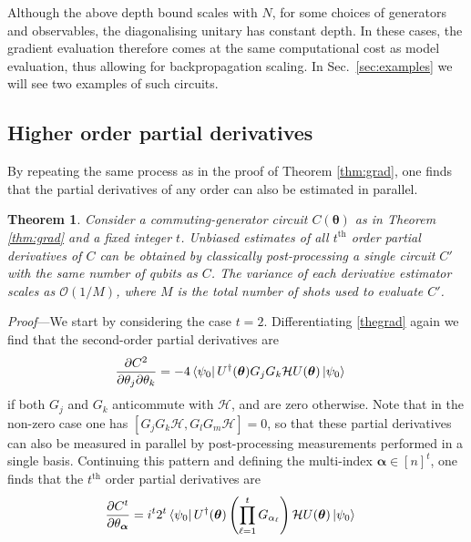 \documentclass[a4paper,twocolumn,11pt,accepted=2025-09-06]{quantumarticle}
\newtheorem{theorem}{Theorem}
\renewcommand{\vec}{\boldsymbol}
\begin{document}
Although the above depth bound scales with $N$, for some choices of generators and observables, the diagonalising unitary has constant depth. In these cases, the gradient evaluation therefore comes at the same computational cost as model evaluation, thus allowing for backpropagation scaling. In Sec.\ \ref{sec:examples} we will see two examples of such circuits. 

\subsection{Higher order partial derivatives}
By repeating the same process as in the proof of Theorem \ref{thm:grad}, one finds that the partial derivatives of any order can also be estimated in parallel.

\begin{theorem}\label{thm:pds}
Consider a commuting-generator circuit $C(\vec{\theta})$ as in Theorem \ref{thm:grad} and a fixed integer $t$. Unbiased estimates of all $t^{\text{th}}$ order partial derivatives of $C$ can be obtained by classically post-processing a single circuit $C'$ with the same number of qubits as $C$. The variance of each derivative estimator scales as $\mathcal{O}(1/M)$, where $M$ is the total number of shots used to evaluate $C'$.
\end{theorem}
%
\emph{Proof}---We start by considering the case $t=2$. Differentiating \eqref{thegrad} again we find that the second-order partial derivatives are
\begin{align}
    \frac{\partial C^2}{\partial \theta_j\partial\theta_k} 
    &=-4\bra{\psi_0} U^{\dagger}(\vec{\theta})G_jG_k\mathcal{H}U(\vec{\theta})\ket{\psi_0}
\end{align}
if both $G_j$ and $G_k$ anticommute with $\mathcal{H}$, and are zero otherwise. Note that in the non-zero  case one has $[G_jG_k\mathcal{H},G_lG_m\mathcal{H}]=0$, so that these partial derivatives can also be measured in parallel by post-processing measurements performed in a single basis. Continuing this pattern and defining the multi-index $\vec{\alpha}\in[n]^t$, one finds that the $t^{\text{th}}$ order partial derivatives are
%
\begin{align}
    \frac{\partial C^t}{\partial \theta_{\vec{\alpha}}} &= i^{t}2^t\bra{\psi_0} U^{\dagger}(\vec{\theta})\left(\prod_{\ell=1}^t G_{\alpha_\ell}\right)\mathcal{H}U(\vec{\theta})\ket{\psi_0}
\end{align}
\end{document}
